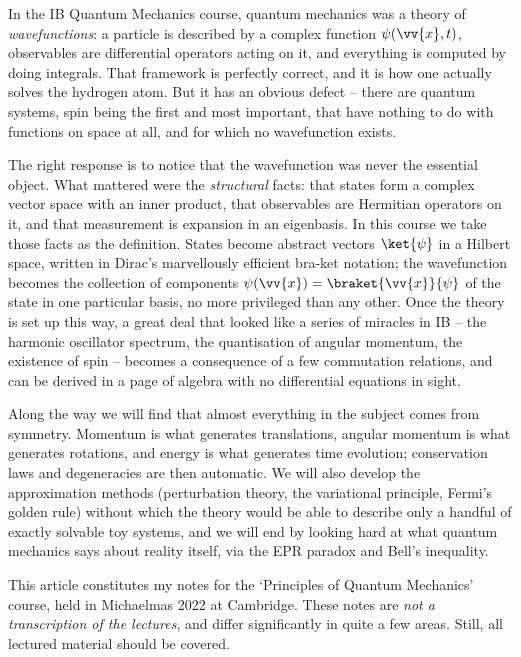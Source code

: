 



In the IB Quantum Mechanics course, quantum mechanics was a theory of \emph{wavefunctions}: a particle is described by a complex function $\psi(\vv{x}, t)$, observables are differential operators acting on it, and everything is computed by doing integrals. That framework is perfectly correct, and it is how one actually solves the hydrogen atom. But it has an obvious defect -- there are quantum systems, spin being the first and most important, that have nothing to do with functions on space at all, and for which no wavefunction exists.

The right response is to notice that the wavefunction was never the essential object. What mattered were the \emph{structural} facts: that states form a complex vector space with an inner product, that observables are Hermitian operators on it, and that measurement is expansion in an eigenbasis. In this course we take those facts as the definition. States become abstract vectors $\ket{\psi}$ in a Hilbert space, written in Dirac's marvellously efficient bra-ket notation; the wavefunction becomes the collection of components $\psi(\vv{x}) = \braket{\vv{x}}{\psi}$ of the state in one particular basis, no more privileged than any other. Once the theory is set up this way, a great deal that looked like a series of miracles in IB -- the harmonic oscillator spectrum, the quantisation of angular momentum, the existence of spin -- becomes a consequence of a few commutation relations, and can be derived in a page of algebra with no differential equations in sight.

Along the way we will find that almost everything in the subject comes from symmetry. Momentum is what generates translations, angular momentum is what generates rotations, and energy is what generates time evolution; conservation laws and degeneracies are then automatic. We will also develop the approximation methods (perturbation theory, the variational principle, Fermi's golden rule) without which the theory would be able to describe only a handful of exactly solvable toy systems, and we will end by looking hard at what quantum mechanics says about reality itself, via the EPR paradox and Bell's inequality.

This article constitutes my notes for the `Principles of Quantum Mechanics' course, held in Michaelmas 2022 at Cambridge. These notes are \emph{not a transcription of the lectures}, and differ significantly in quite a few areas. Still, all lectured material should be covered.



